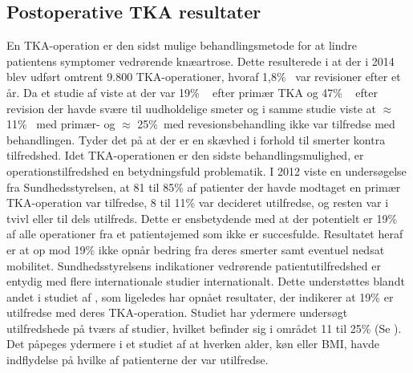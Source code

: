 \subsection*{Postoperative TKA resultater}

En TKA-operation er den sidst mulige behandlingsmetode for at lindre patientens symptomer vedrørende knæartrose. Dette resulterede i at der i 2014 blev udført omtrent 9.800 TKA-operationer, hvoraf 1,8\% ~var revisioner efter et år. \citep{aarsrapport2016} Da et studie af \citep{Petersen2015} viste at der var 19\% ~ efter primær TKA og 47\% ~ efter revision der havde svære til uudholdelige smeter og i samme studie viste at $\approx$ 11\%~ med primær- og $\approx$ 25\%~med revesionsbehandling ikke var tilfredse med behandlingen.\citep{Petersen2015} Tyder det på at der er en skævhed i forhold til smerter kontra tilfredshed. Idet TKA-operationen er den sidste behandlingsmulighed, er operationstilfredshed en betydningsfuld problematik. I 2012 viste en undersøgelse fra Sundhedsstyrelsen, at 81 til 85\% af patienter der havde modtaget en primær TKA-operation var tilfredse, 8 til 11\% var decideret utilfredse, og resten var i tvivl eller til dels utilfreds. Dette er ensbetydende med at der potentielt er 19\%~ af alle operationer fra et patientøjemed som ikke er succesfulde. Resultatet heraf er at op mod 19\% ikke opnår bedring fra deres smerter samt eventuel nedsat mobilitet. \citep{brostrom2012} Sundhedsstyrelsens indikationer vedrørende patientutilfredshed er entydig med flere internationale studier internationalt. Dette understøttes blandt andet i studiet af \cite{Bourne2010}, som ligeledes har opnået resultater, der indikerer at 19\% er utilfredse med deres TKA-operation. Studiet har ydermere undersøgt utilfredshede på tværs af studier, hvilket befinder sig i området 11 til 25\% (Se ). \citep{Bourne2010} Det påpeges ydermere i et studiet af \cite{Jacobs2014} at hverken alder, køn eller BMI, havde indflydelse på hvilke af patienterne der var utilfredse. \citep{Jacobs2014}
